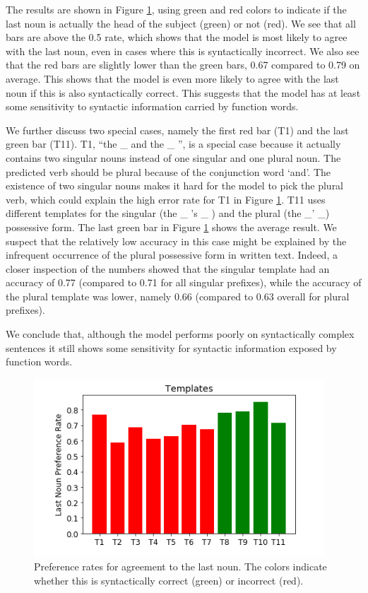 The results are shown in Figure \ref{fig:last_noun_rates},
using green and red colors to indicate if 
the last noun is actually the head of the subject (green)
or not (red). 
%
We see that all bars are above the 0.5 rate,
which shows that the model is most
likely to agree with the last noun,
even in cases where this is syntactically incorrect. 
%
We also see that the red bars are slightly
lower than the green bars,
0.67 compared to 0.79 on average.
This shows that the model is even more likely
to agree with the last noun if this is
also syntactically correct.
This suggests that the model has 
at least some sensitivity
to syntactic information carried by function words.
%

%
We further discuss two special cases,
namely the first red bar (T1) and 
the last green bar (T11).
T1, ``the \_ and the \_ '', is a special case because it 
actually contains two singular nouns
instead of one singular and one plural noun. 
The predicted verb should be plural because of the
conjunction word `and'.
The existence of two singular nouns 
makes it hard for the model
to pick the plural verb,
which could explain the high error rate
for T1 in Figure \ref{fig:last_noun_rates}.
%
T11 uses different templates for the singular 
(the \_ 's \_ ) and the plural (the \_' \_) possessive form.
The last green bar in Figure \ref{fig:last_noun_rates} shows the average result.
We suspect that the relatively low accuracy
in this case might be explained by the infrequent
occurrence of the plural possessive form in written text.
Indeed, a closer inspection of the numbers showed that
the singular template had an accuracy
of 0.77 (compared to 0.71 for all singular prefixes), 
while the accuracy of the plural template
was lower, namely 0.66 (compared to 0.63 overall for plural prefixes).
%

We conclude that, although the model 
performs poorly on syntactically complex sentences it
still shows some sensitivity for syntactic 
information exposed by function words. 


\begin{figure}
    \centering
\includegraphics[scale=0.5]{screenshot-syntactic-templates} 
\caption{Preference rates for agreement to the last noun.
The colors indicate whether this is syntactically correct (green)
or incorrect (red).
}
\label{fig:last_noun_rates}
\end{figure}



